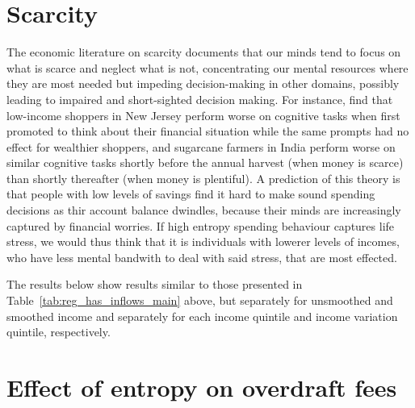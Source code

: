 \section{Scarcity}%
\label{sec:scarcity}

The economic literature on scarcity documents that our minds tend to focus on
what is scarce and neglect what is not, concentrating our mental resources
where they are most needed but impeding decision-making in other domains,
possibly leading to impaired and short-sighted decision
making\citep{shah2012some, mullainathan2013scarcity, haushofer2014psychology}.
For instance, \citet{mani2013poverty} find that low-income shoppers in New
Jersey perform worse on cognitive tasks when first promoted to think about
their financial situation while the same prompts had no effect for wealthier
shoppers, and sugarcane farmers in India perform worse on similar cognitive
tasks shortly before the annual harvest (when money is scarce) than shortly
thereafter (when money is plentiful). A prediction of this theory is that
people with low levels of savings find it hard to make sound spending decisions
as thir account balance dwindles, because their minds are increasingly captured
by financial worries. If high entropy spending behaviour captures life stress,
we would thus think that it is individuals with lowerer levels of incomes, who
have less mental bandwith to deal with said stress, that are most effected.

The results below show results similar to those presented in
Table~\ref{tab:reg_has_inflows_main} above, but separately for unsmoothed and
smoothed income and separately for each income quintile and income variation
quintile, respectively.








\section{Effect of entropy on overdraft fees}%
\label{sub:effect_of_entropy_on_overdraft_fees}

